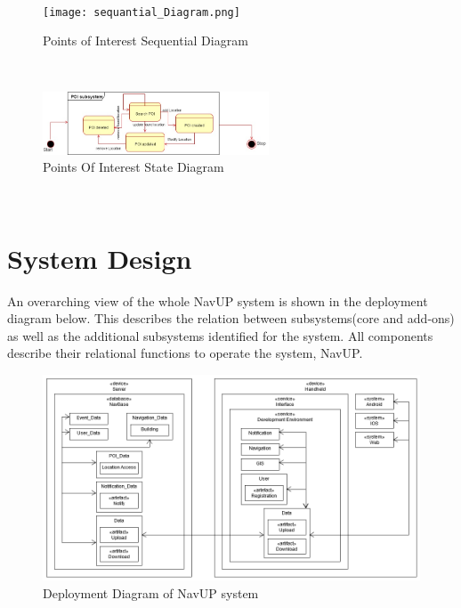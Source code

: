 \documentclass{article}
\begin{document}
\mbox{}\\
    \bigskip
\begin{figure}[h!]
        \begin{center}
            \texttt{[image: sequantial\_Diagram.png]} \caption{Points of Interest Sequential Diagram}
        \end{center}
    \end{figure}

\mbox{}\\
    \bigskip
    
    \begin{figure}[h!]
        \begin{center}
            \includegraphics[width=0.6\textwidth]{POI_State_Diagram.jpg} \caption{Points Of Interest State Diagram}
        \end{center}
    \end{figure}
    \mbox{}\\
    \bigskip
    \clearpage
\newpage
\section{System Design}
An overarching view of the whole NavUP system is shown in the deployment diagram below. This describes the relation between subsystems(core and add-ons) as well as the additional subsystems identified for the system. All components describe their relational functions to operate the system, NavUP.
\mbox{}\\
    \bigskip
\begin{figure}[h!]
	\begin{center}
		\includegraphics[width=1.2\textwidth]{DeploymentDiagram.png} \caption{Deployment Diagram of NavUP system}
		\end{center}
\end{figure}
\mbox{}\\
    \bigskip
    
\end{document}
